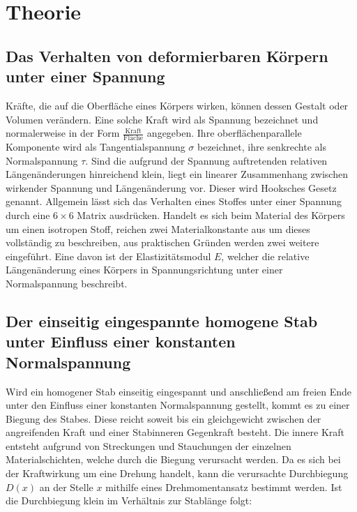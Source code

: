 
\section{Theorie}
\label{sec:Theorie}

\subsection{Das Verhalten von deformierbaren Körpern unter einer Spannung}
Kräfte, die auf die Oberfläche eines Körpers wirken, können dessen Gestalt oder
 Volumen verändern. Eine solche Kraft wird als Spannung bezeichnet und normalerweise
  in der Form $\frac{\text{Kraft}}{\text{Fläche}}$ angegeben. Ihre oberflächenparallele
   Komponente wird als Tangentialspannung $\sigma$ bezeichnet, ihre senkrechte als Normalspannung $\tau$.
Sind die aufgrund der Spannung auftretenden relativen Längenänderungen hinreichend
 klein, liegt ein linearer Zusammenhang zwischen wirkender Spannung und Längenänderung vor.
      Dieser wird Hooksches Gesetz genannt.
       Allgemein lässt sich das Verhalten eines Stoffes unter einer Spannung durch eine
        $6\times6$ Matrix ausdrücken.
      Handelt es sich beim Material des Körpers um einen isotropen Stoff,
       reichen zwei Materialkonstante aus um dieses vollständig
        zu beschreiben, aus praktischen Gründen werden zwei weitere eingeführt.
         Eine davon ist der Elastizitätsmodul $E$, welcher die
         relative Längenänderung eines Körpers in Spannungsrichtung unter
          einer Normalspannung beschreibt.

\subsection{Der einseitig eingespannte homogene Stab unter Einfluss einer konstanten Normalspannung}
Wird ein homogener Stab einseitig eingespannt und anschließend am freien Ende unter den Einfluss
 einer konstanten Normalspannung gestellt, kommt es zu einer Biegung des Stabes. Diese
  reicht soweit bis ein gleichgewicht zwischen der angreifenden Kraft und einer Stabinneren Gegenkraft besteht. Die
   innere Kraft entsteht aufgrund von Streckungen und Stauchungen der einzelnen
    Materialschichten, welche durch die Biegung verursacht werden. Da es sich bei
     der Kraftwirkung um eine Drehung handelt, kann die verursachte Durchbiegung
      $D(x)$ an der Stelle $x$ mithilfe eines Drehmomentansatz bestimmt werden.
       Ist die Durchbiegung klein im Verhältnis zur Stablänge folgt:


